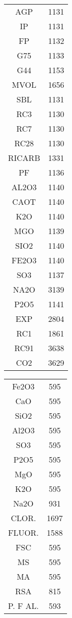 \documentclass[a4paper]{article}
\begin{document}
\begin{center}
\begin{tabular}{ c c }
AGP     &  1131\\
IP      &  1131\\
FP      &  1132\\
G75    &  1133\\
G44   &  1153\\
MVOL    &  1656\\
SBL     &  1131\\
RC3     &  1130\\
RC7     &  1130\\
RC28    &  1130\\
RICARB  &  1331\\
PF      &  1136\\
AL2O3   &  1140\\
CAOT    &  1140\\
K2O     &  1140\\
MGO     &  1139\\
SIO2    &  1140\\
FE2O3   &  1140\\
SO3     &  1137\\
NA2O    &  3139\\
P2O5    &  1141\\
EXP     &  2804\\
RC1     &  1861\\
RC91    &  3638\\
CO2     &  3629 
\end{tabular}
\end{center}

\newpage

\begin{center}
\begin{tabular}{ c c }
Fe2O3     &   595\\
CaO       &  595\\
SiO2      &   595\\
Al2O3     &   595\\
SO3       &   595\\
P2O5      &   595\\
MgO       &   595\\
K2O       &   595\\
Na2O      &   931\\
CLOR.     &  1697\\
FLUOR.    &  1588\\
FSC       &   595\\
MS        &   595\\
MA        &   595\\
RSA       &   815\\
P. F AL.  &   593 \\
\end{tabular}
\end{center}
\end{document}
